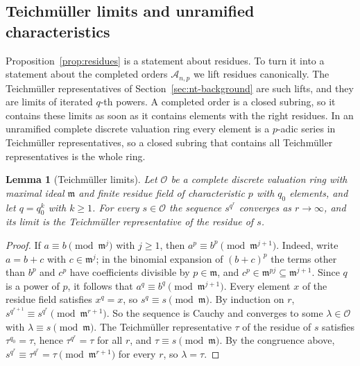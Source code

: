 \documentclass[11pt]{article}
\theoremstyle{plain}
\newtheorem{lemma}[theorem]{Lemma}
\theoremstyle{definition}
\theoremstyle{remark}
\newcommand{\OO}{\mathcal O}
\begin{document}
\subsection{Teichm\"uller limits and unramified characteristics}
\label{sec:orders-unramified}

Proposition~\ref{prop:residues} is a statement about residues.  To turn
it into a statement about the completed orders $\mathcal A_{n,p}$ we lift
residues canonically.  The Teichm\"uller representatives of
Section~\ref{sec:nt-background} \cite[Remark~7.36]{MilneANT} are such
lifts, and they are limits of iterated $q$-th powers.  A completed order
is a closed subring, so it contains these limits as soon as it contains
elements with the right residues.  In an unramified complete discrete
valuation ring every element is a $p$-adic series in Teichm\"uller
representatives, so a closed subring that contains all Teichm\"uller
representatives is the whole ring.

\begin{lemma}[Teichm\"uller limits]\label{lem:teichmuller-limit}
Let $\OO$ be a complete discrete valuation ring with maximal ideal
$\mathfrak m$ and finite residue field of characteristic $p$ with $q_0$
elements, and let $q=q_0^k$ with $k\geq1$.  For every $s\in\OO$ the
sequence $s^{q^r}$ converges as $r\to\infty$, and its limit is the
Teichm\"uller representative of the residue of $s$.
\end{lemma}
\begin{proof}
If $a\equiv b\pmod{\mathfrak m^j}$ with $j\geq1$, then
$a^p\equiv b^p\pmod{\mathfrak m^{j+1}}$.  Indeed, write $a=b+c$ with
$c\in\mathfrak m^j$; in the binomial expansion of $(b+c)^p$ the terms
other than $b^p$ and $c^p$ have coefficients divisible by $p\in\mathfrak
m$, and $c^p\in\mathfrak m^{pj}\subseteq\mathfrak m^{j+1}$.  Since $q$ is
a power of $p$, it follows that $a^q\equiv b^q\pmod{\mathfrak m^{j+1}}$.
Every element $x$ of the residue field satisfies $x^q=x$, so
$s^q\equiv s\pmod{\mathfrak m}$.  By induction on $r$,
$s^{q^{r+1}}\equiv s^{q^r}\pmod{\mathfrak m^{r+1}}$.  So the sequence is
Cauchy and converges to some $\lambda\in\OO$ with
$\lambda\equiv s\pmod{\mathfrak m}$.  The Teichm\"uller representative
$\tau$ of the residue of $s$ satisfies $\tau^{q_0}=\tau$, hence
$\tau^{q^r}=\tau$ for all $r$, and $\tau\equiv s\pmod{\mathfrak m}$.  By
the congruence above, $s^{q^r}\equiv\tau^{q^r}=\tau\pmod{\mathfrak
m^{r+1}}$ for every $r$, so $\lambda=\tau$.
\end{proof}
\end{document}
